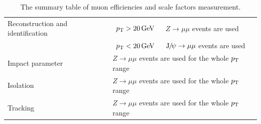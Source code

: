 		 \begin{table}[!ht]
		   \begin{center}
		     \begin{tabular}{|l|c|l|}
		       \hline
		       Reconstruction and identification & $p_{\mathrm{T}} > 20\,\text{Ge\hspace{-.08em}V}$ & $Z\to\mu\mu$ events are used            \\
		       & $p_{\mathrm{T}} < 20\,\text{Ge\hspace{-.08em}V}$ & ${\mathrm{J}\hspace{-.08em}/\hspace{-.14em}\psi}\to\mu\mu$  events are used\\
		       \hline
		       Impact parameter         &  \multicolumn{2}{l|}{$Z\to\mu\mu$ events are used for the whole $p_{\mathrm{T}}$ range}\\
		       \hline
		       Isolation    &        \multicolumn{2}{l|}{$Z\to\mu\mu$ events are used for the whole $p_{\mathrm{T}}$ range}\\
		       \hline
		       Tracking     &        \multicolumn{2}{l|}{$Z\to\mu\mu$ events are used for the whole $p_{\mathrm{T}}$ range}\\
		       \hline
		     \end{tabular}
		     \caption{The summary table of muon efficiencies and scale factors measurement. \label{tab:MuonIDSFs}}
		   \end{center}
		 \end{table}
		
